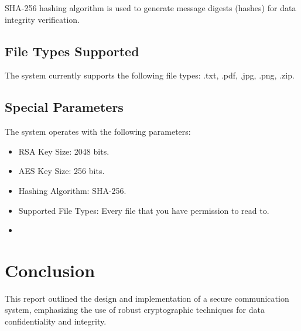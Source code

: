 \documentclass{article}
\begin{document}
SHA-256 hashing algorithm is used to generate message digests (hashes) for data integrity verification.

\subsection{File Types Supported}

The system currently supports the following file types: .txt, .pdf, .jpg, .png, .zip. 

\subsection{Special Parameters}

The system operates with the following parameters:

\begin{itemize}
    \item RSA Key Size: 2048 bits.
    \item AES Key Size: 256 bits.
    \item Hashing Algorithm: SHA-256.
    \item Supported File Types: Every file that you have permission to read to.
    \item 
\end{itemize}

\section{Conclusion}

This report outlined the design and implementation of a secure communication system, emphasizing the use of robust cryptographic techniques for data confidentiality and integrity. 
\end{document}

